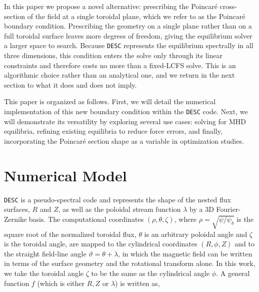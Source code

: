 \documentclass{jpp}
\begin{document}
In this paper we propose a novel alternative: prescribing the Poincaré cross-section of the field at a single toroidal plane, which we refer to as the Poincaré boundary condition. Prescribing the geometry on a single plane rather than on a full toroidal surface leaves more degrees of freedom, giving the equilibrium solver a larger space to search. Because \texttt{DESC} represents the equilibrium spectrally in all three dimensions, this condition enters the solve only through its linear constraints and therefore costs no more than a fixed-LCFS solve. This is an algorithmic choice rather than an analytical one, and we return in the next section to what it does and does not imply.

This paper is organized as follows. First, we will detail the numerical implementation of this new boundary condition within the \texttt{DESC} code. Next, we will demonstrate its versatility by exploring several use cases: solving for MHD equilibria, refining existing equilibria to reduce force errors, and finally, incorporating the Poincaré section shape as a variable in optimization studies.

\section{Numerical Model}
\texttt{DESC} is a pseudo-spectral code and represents the shape of the nested flux surfaces, $R$ and $Z$, as well as the poloidal stream function $\lambda$ by a 3D Fourier-Zernike basis. The computational coordinates $(\rho, \theta, \zeta)$, where $\rho=\sqrt{\psi/\psi_b}$ is the square root of the normalized toroidal flux, $\theta$ is an arbitrary poloidal angle and $\zeta$ is the toroidal angle, are mapped to the cylindrical coordinates $(R, \phi, Z)$ and to the straight field-line angle $\vartheta = \theta + \lambda$, in which the magnetic field can be written in terms of the surface geometry and the rotational transform alone. In this work, we take the toroidal angle $\zeta$ to be the same as the cylindrical angle $\phi$. A general function $f$ (which is either $R, Z$ or $\lambda$) is written as,
\end{document}
